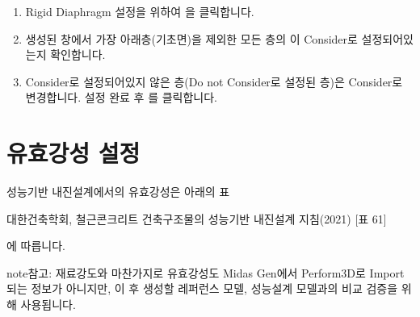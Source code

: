 \documentclass[a4paper,11pt,korean,openany,oneside]{sphinxmanual}
\begin{document}
\begin{sphinxShadowBox}
\begin{enumerate}
%
\item {} 
\sphinxAtStartPar
Rigid Diaphragm 설정을 위하여 \sphinxhyphen{}  \sphinxhyphen{} 을 클릭합니다.

\item {} 
\sphinxAtStartPar
생성된 창에서 가장 아래층(기초면)을 제외한 모든 층의 이 Consider로 설정되어있는지 확인합니다.

\begin{center}
\noindent{}
\end{center}

\item {} 
\sphinxAtStartPar
Consider로 설정되어있지 않은 층(Do not Consider로 설정된 층)은 Consider로 변경합니다. 설정 완료 후 를 클릭합니다.

\end{enumerate}
\end{sphinxShadowBox}

\sphinxstepscope


\section{유효강성 설정}
\label{\detokenize{1_stiffness_setting:id1}}\label{\detokenize{1_stiffness_setting::doc}}
\sphinxAtStartPar
성능기반 내진설계에서의 유효강성은 아래의 표%
\begin{footnote}[1]\sphinxAtStartFootnote
대한건축학회, 철근콘크리트 건축구조물의 성능기반 내진설계 지침(2021) {[}표 6\sphinxhyphen{}1{]}
%
\end{footnote} 에 따릅니다.

\begin{figure}[htbp]
\centering
\capstart

\noindent{}
\caption{}\label{\detokenize{1_stiffness_setting:id10}}\end{figure}

\begin{sphinxadmonition}{note}{참고:}
\sphinxAtStartPar
재료강도와 마찬가지로 유효강성도 Midas Gen에서 Perform\sphinxhyphen{}3D로 Import되는 정보가 아니지만,
이 후 생성할 레퍼런스 모델, 성능설계 모델과의 비교 검증을 위해 사용됩니다.
\end{sphinxadmonition}
\end{document}
